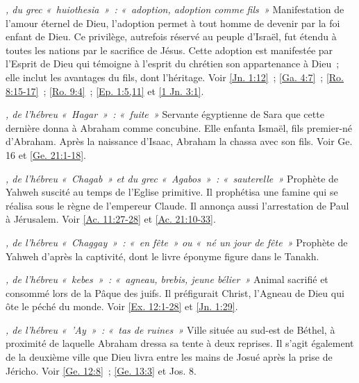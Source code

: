 \begin{multicols}{2}
\textit{, du grec «~huiothesia~»~: «~adoption, adoption comme fils~»}\newline
Manifestation de l'amour éternel de Dieu, l'adoption permet à tout homme de devenir par la foi enfant de Dieu. Ce privilège, autrefois réservé au peuple d'Israël, fut étendu à toutes les nations par le sacrifice de Jésus. Cette adoption est manifestée par l'Esprit de Dieu qui témoigne à l'esprit du chrétien son appartenance à Dieu~; elle inclut les avantages du fils, dont l'héritage.\newline
Voir \vref{Jn. 1:12}~; \vref{Ga. 4:7}~; \vref{Ro. 8:15-17}~; \vref{Ro. 9:4}~; \vref{Ep. 1:5,11} et \vref{1 Jn. 3:1}.

\textit{, de l'hébreu «~Hagar~»~: «~fuite~»}\newline
Servante égyptienne de Sara que cette dernière donna à Abraham comme concubine. Elle enfanta Ismaël, fils premier-né d'Abraham. Après la naissance d'Isaac, Abraham la chassa avec son fils.\newline
Voir Ge. 16 et \vref{Ge. 21:1-18}.

\textit{, de l'hébreu «~Chagab~» et du grec «~Agabos~»~: «~sauterelle~»}\newline
Prophète de Yahweh suscité au temps de l'Eglise primitive. Il prophétisa une famine qui se réalisa sous le règne de l'empereur Claude. Il annonça aussi l'arrestation de Paul à Jérusalem.\newline
Voir \vref{Ac. 11:27-28} et \vref{Ac. 21:10-33}.

\textit{, de l'hébreu «~Chaggay~»~: «~en fête~» ou «~né un jour de fête~»}\newline
Prophète de Yahweh d'après la captivité, dont le livre éponyme figure dans le Tanakh.

\textit{, de l'hébreu «~kebes~»~: «~agneau, brebis, jeune bélier~»}\newline
Animal sacrifié et consommé lors de la Pâque des juifs. Il préfigurait Christ, l'Agneau de Dieu qui ôte le péché du monde.\newline
Voir \vref{Ex. 12:1-28} et \vref{Jn. 1:29}.

\textit{, de l'hébreu «~'Ay~»~: «~tas de ruines~»}\newline
Ville située au sud-est de Béthel, à proximité de laquelle Abraham dressa sa tente à deux reprises. Il s'agit également de la deuxième ville que Dieu livra entre les mains de Josué après la prise de Jéricho.\newline
Voir \vref{Ge. 12:8}~; \vref{Ge. 13:3} et Jos. 8.


\end{multicols}
